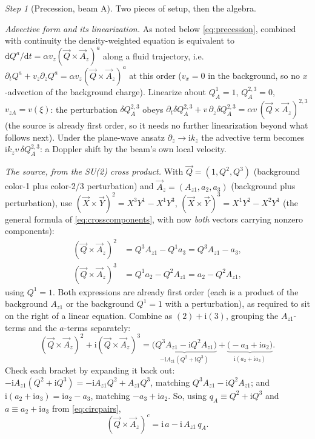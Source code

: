 \documentclass[11pt,a4paper]{article}
\numberwithin{equation}{section}
\theoremstyle{remark}
\newtheorem{step}{Step}[subsection]
\newcommand{\kz}{k_z}
\newcommand{\Az}{A_{z1}}
\newcommand{\dd}{\mathrm{d}}
\newcommand{\ii}{\mathrm{i}}
\begin{document}
\begin{step}[Precession, beam A]
Two pieces of setup, then the algebra.

\emph{Advective form and its linearization.} As noted below
\eqref{eq:precession}, combined with continuity the density-weighted
equation is equivalent to $\dd Q^a/\dd t=\alpha v_z(\vec Q\times\vec
A_z)^a$ along a fluid trajectory, i.e.\ $\partial_tQ^a+v_z\partial_zQ^a
=\alpha v_z(\vec Q\times\vec A_z)^a$ at this order ($v_x=0$ in the
background, so no $x$-advection of the background charge). Linearize
about $Q^1_A=1$, $Q^{2,3}_A=0$, $v_{zA}=v(\xi)$: the perturbation
$\delta Q^{2,3}_A$ obeys $\partial_t\delta Q^{2,3}_A+v\,\partial_z\delta
Q^{2,3}_A=\alpha v\,(\vec Q\times\vec A_z)^{2,3}$ (the source is already
first order, so it needs no further linearization beyond what follows
next). Under the plane-wave ansatz $\partial_z\to\ii\kz$ the advective
term becomes $\ii\kz v\,\delta Q^{2,3}_A$: a Doppler shift by the beam's
own local velocity.

\emph{The source, from the SU(2) cross product.} With $\vec Q=
(1,Q^2,Q^3)$ (background color-1 plus color-2/3 perturbation) and
$\vec A_z=(\Az,a_2,a_3)$ (background plus perturbation), use
$(\vec X\times\vec Y)^2=X^3Y^1-X^1Y^3$, $(\vec X\times\vec Y)^3
=X^1Y^2-X^2Y^1$ (the general formula of \eqref{eq:crosscomponents}, with
now \emph{both} vectors carrying nonzero components):
\begin{align}
(\vec Q\times\vec A_z)^2&=Q^3\Az-Q^1a_3=Q^3\Az-a_3 ,\\
(\vec Q\times\vec A_z)^3&=Q^1a_2-Q^2\Az=a_2-Q^2\Az ,
\end{align}
using $Q^1=1$. Both expressions are already first order (each is a
product of the background $\Az$ or the background $Q^1=1$ with a
perturbation), as required to sit on the right of a linear equation.
Combine as $(2)+\ii(3)$, grouping the $\Az$-terms and the $a$-terms
separately:
\begin{equation}
(\vec Q\times\vec A_z)^2+\ii(\vec Q\times\vec A_z)^3
=\underbrace{\bigl(Q^3\Az-\ii Q^2\Az\bigr)}_{-\ii\Az(Q^2+\ii Q^3)}
+\underbrace{\bigl(-a_3+\ii a_2\bigr)}_{\ii(a_2+\ii a_3)} .
\end{equation}
Check each bracket by expanding it back out: $-\ii\Az(Q^2+\ii Q^3)
=-\ii\Az Q^2+\Az Q^3$, matching $Q^3\Az-\ii Q^2\Az$; and
$\ii(a_2+\ii a_3)=\ii a_2-a_3$, matching $-a_3+\ii a_2$. So, using
$q_A\equiv Q^2+\ii Q^3$ and $a\equiv a_2+\ii a_3$ from
\eqref{eq:circpairs},
\begin{equation}
(\vec Q\times\vec A_z)^c=\ii\,a-\ii\,\Az\,q_A .
\end{equation}


\end{step}
\end{document}
